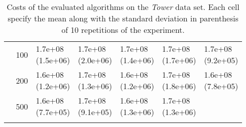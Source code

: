 \begin{longtable}{lllllll}
    & 100 &  \parbox[t]{17mm}{1.7e+08\\\small(1.5e+06)} &  \parbox[t]{17mm}{1.7e+08\\\small(2.0e+06)} &  \parbox[t]{17mm}{1.7e+08\\\small(1.4e+06)} &  \parbox[t]{17mm}{1.7e+08\\\small(1.7e+06)} &  \parbox[t]{17mm}{1.7e+08\\\small(9.2e+05)} \\
    & 200 &  \parbox[t]{17mm}{1.6e+08\\\small(1.2e+06)} &  \parbox[t]{17mm}{1.7e+08\\\small(1.3e+06)} &  \parbox[t]{17mm}{1.6e+08\\\small(1.2e+06)} &  \parbox[t]{17mm}{1.7e+08\\\small(1.8e+06)} &  \parbox[t]{17mm}{1.6e+08\\\small(7.8e+05)} \\
    & 500 &  \parbox[t]{17mm}{1.6e+08\\\small(7.7e+05)} &  \parbox[t]{17mm}{1.7e+08\\\small(9.1e+05)} &  \parbox[t]{17mm}{1.6e+08\\\small(1.3e+06)} &  \parbox[t]{17mm}{1.7e+08\\\small(1.3e+06)} &                 \\
\bottomrule
\caption{Costs of the evaluated algorithms on the \textit{Tower} data set. Each cell specify the mean along with the standard deviation in parenthesis of 10 repetitions of the experiment.}
\label{tab:real-cost-mean-std-tower}
\end{longtable}

